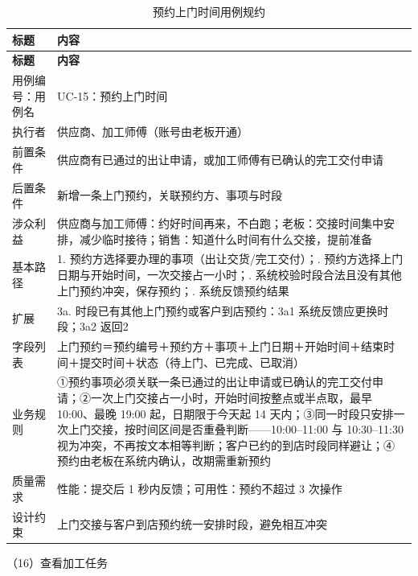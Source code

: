 {\small
\begin{longtable}{@{}L{3.0cm} L{12.3cm}@{}}
\caption{预约上门时间用例规约}\label{tab:uc-15}\\
\toprule
\textbf{标题} & \textbf{内容} \\
\midrule
\endfirsthead
\toprule
\textbf{标题} & \textbf{内容} \\
\midrule
\endhead
用例编号：用例名 & UC-15：预约上门时间 \\
\midrule
执行者 & 供应商、加工师傅（账号由老板开通） \\
\midrule
前置条件 & 供应商有已通过的出让申请，或加工师傅有已确认的完工交付申请 \\
\midrule
后置条件 & 新增一条上门预约，关联预约方、事项与时段 \\
\midrule
涉众利益 & 供应商与加工师傅：约好时间再来，不白跑；\newline 老板：交接时间集中安排，减少临时接待；\newline 销售：知道什么时间有什么交接，提前准备 \\
\midrule
基本路径 & 1. 预约方选择要办理的事项（出让交货/完工交付）；. 预约方选择上门日期与开始时间，一次交接占一小时；. 系统校验时段合法且没有其他上门预约冲突，保存预约；. 系统反馈预约结果 \\
\midrule
扩展 & 3a. 时段已有其他上门预约或客户到店预约：3a1 系统反馈应更换时段；3a2 返回2 \\
\midrule
字段列表 & 上门预约＝预约编号＋预约方＋事项＋上门日期＋开始时间＋结束时间＋提交时间＋状态（待上门、已完成、已取消） \\
\midrule
业务规则 & ①预约事项必须关联一条已通过的出让申请或已确认的完工交付申请；\newline ②一次上门交接占一小时，开始时间按整点或半点取，最早 10:00、最晚 19:00 起，日期限于今天起 14 天内；\newline ③同一时段只安排一次上门交接，按时间区间是否重叠判断——10:00--11:00 与 10:30--11:30 视为冲突，不再按文本相等判断；客户已约的到店时段同样避让；\newline ④预约由老板在系统内确认，改期需重新预约 \\
\midrule
质量需求 & 性能：提交后 1 秒内反馈；\newline 可用性：预约不超过 3 次操作 \\
\midrule
设计约束 & 上门交接与客户到店预约统一安排时段，避免相互冲突 \\
\midrule
\bottomrule
\end{longtable}}
\noindent（16）查看加工任务

